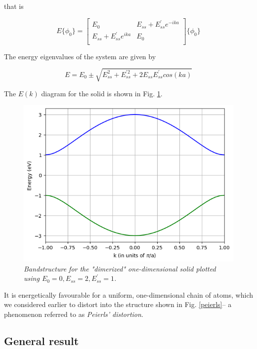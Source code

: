 \documentclass{resonance}
\begin{document}
that is

\begin{equation*}
E\{\phi_0\} =
\begin{bmatrix}
    E_0 & E_{ss}+E_{ss}^{'}e^{-ika} \\
    E_{ss}+E_{ss}^{'}e^{ika} & E_0 \\
\end{bmatrix} \{\phi_0\}
\end{equation*}

The energy eigenvalues of the system are given by

\begin{equation}
    E = E_0 \pm \sqrt{E_{ss}^{2}+E_{ss}^{'2}+2E_{ss}E_{ss}^{'}cos(ka)}
\end{equation}

The $E(k)$ diagram for the solid is shown in Fig. \ref{ssh}. 

\begin{figure}[!t]
\caption{\textit{Bandstructure for the "dimerized" one-dimensional solid plotted using $E_{0} = 0, E_{ss} = 2, E_{ss}^{'} = 1$.}}\label{ssh}
\vspace{6pt}
\centering
\includegraphics[scale=0.6]{ssh.png}
\end{figure}

It is energetically favourable for a uniform, one-dimensional chain of atoms, which we considered earlier to distort into the structure shown in Fig. \ref{peierls}-- a phenomenon referred to as \textit{Peierls' distortion}. 

\subsection{General result}
\end{document}

